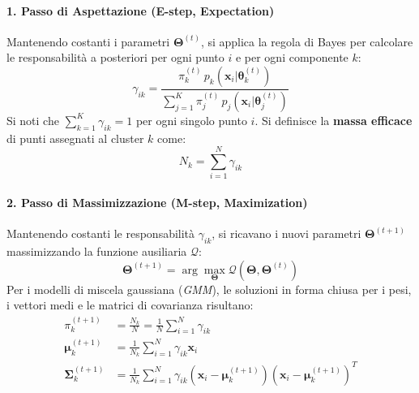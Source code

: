 \paragraph{1. Passo di Aspettazione (E-step, Expectation)}
Mantenendo costanti i parametri $\boldsymbol{\Theta}^{(t)}$, si applica la regola di Bayes per calcolare le responsabilità a posteriori per ogni punto $i$ e per ogni componente $k$:
\begin{equation}
\label{eq:dm-e-step}
\gamma_{ik} = \frac{\pi_k^{(t)} \, p_k(\mathbf{x}_i | \boldsymbol{\theta}_k^{(t)})}{\sum_{j=1}^K \pi_j^{(t)} \, p_j(\mathbf{x}_i | \boldsymbol{\theta}_j^{(t)})}
\end{equation}
Si noti che $\sum_{k=1}^K \gamma_{ik} = 1$ per ogni singolo punto $i$. Si definisce la \textbf{massa efficace} di punti assegnati al cluster $k$ come:
\begin{equation}
\label{eq:dm-effective-nk}
N_k = \sum_{i=1}^N \gamma_{ik}
\end{equation}

\paragraph{2. Passo di Massimizzazione (M-step, Maximization)}
Mantenendo costanti le responsabilità $\gamma_{ik}$, si ricavano i nuovi parametri $\boldsymbol{\Theta}^{(t+1)}$ massimizzando la funzione ausiliaria $\mathcal{Q}$:
\begin{equation}
\label{eq:dm-m-step-argmax}
\boldsymbol{\Theta}^{(t+1)} = \arg\max_{\boldsymbol{\Theta}} \mathcal{Q}(\boldsymbol{\Theta}, \boldsymbol{\Theta}^{(t)})
\end{equation}
Per i modelli di miscela gaussiana (\textit{GMM}), le soluzioni in forma chiusa per i pesi, i vettori medi e le matrici di covarianza risultano:
\begin{align}
\label{eq:dm-m-step-pi}
\pi_k^{(t+1)} &= \frac{N_k}{N} = \frac{1}{N} \sum_{i=1}^N \gamma_{ik} \\
\label{eq:dm-m-step-mu}
\boldsymbol{\mu}_k^{(t+1)} &= \frac{1}{N_k} \sum_{i=1}^N \gamma_{ik} \mathbf{x}_i \\
\label{eq:dm-m-step-sigma}
\boldsymbol{\Sigma}_k^{(t+1)} &= \frac{1}{N_k} \sum_{i=1}^N \gamma_{ik} (\mathbf{x}_i - \boldsymbol{\mu}_k^{(t+1)}) (\mathbf{x}_i - \boldsymbol{\mu}_k^{(t+1)})^T
\end{align}

